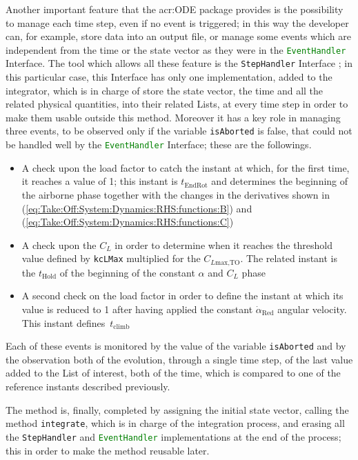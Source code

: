 \bigskip
\noindent
Another important feature that the \gls{acr:ODE} package provides is the possibility to manage each time step, even if no event is triggered; in this way the developer can, for example, store data into an output file, or manage some events which are independent from the time or the state vector as they were in the \lstinline[language=Java]!EventHandler! \gls{Interface}. The tool which allows all these feature is the \lstinline[language=Java]!StepHandler! \gls{Interface} \cite{apache:ode}; in this particular case, this \gls{Interface} has only one implementation, added to the integrator, which is in charge of store the state vector, the time and all the related physical quantities, into their related \gls{List}s, at every time step in order to make them usable outside this method. Moreover it has a key role in managing three events, to be observed only if the variable \lstinline[language=Java]!isAborted! is false, that could not be handled well by the \lstinline[language=Java]!EventHandler! \gls{Interface}; these are the followings.
%
\begin{itemize}
\item A check upon the load factor to catch the instant at which, for the first time, it reaches a value of 1; this instant is $t_{\text{EndRot}}$ and determines the beginning of the airborne phase together with the changes in the derivatives shown in (\ref{eq:Take:Off:System:Dynamics:RHS:functions:B}) and (\ref{eq:Take:Off:System:Dynamics:RHS:functions:C})
\item A check upon the $C_L$ in order to determine when it reaches the threshold value defined by \lstinline[language=Java]!kcLMax! multiplied for the $C_{L\text{max,TO}}$. The related instant is the $t_{\text{Hold}}$ of the beginning of the constant $\alpha$ and $C_L$ phase
\item A second check on the load factor in order to define the instant at which its value is reduced to 1 after having applied the constant $\dot\alpha_{\text{Red}}$ angular velocity. This instant defines~$t_{\text{climb}}$ 
\end{itemize}
%
Each of these events is monitored by the value of the variable \lstinline[language=Java]!isAborted! and by the observation both of the evolution, through a single time step, of the last value added to the \gls{List} of interest, both of the time, which is compared to one of the reference instants described previously.

\bigskip
\noindent
The method is, finally, completed by assigning the initial state vector, calling the method \lstinline[language=Java]!integrate!, which is in charge of the integration process, and erasing all the \lstinline[language=Java]!StepHandler! and \lstinline[language=Java]!EventHandler! implementations at the end of the process; this in order to make the method reusable later.

